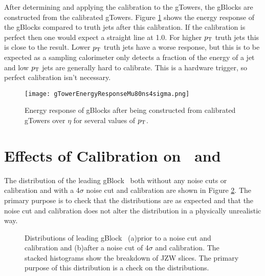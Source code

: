  After determining and applying the calibration to the gTowers, the gBlocks are constructed from the calibrated gTowers.  Figure \ref{fig:gTowerEnergyResponseSlice} shows the energy response of the gBlocks compared to truth jets after this calibration.  If the calibration is perfect then one would expect a straight line at 1.0.  For higher $p_{\mathrm{T}}$ truth jets this is close to the result.  Lower $p_{\mathrm{T}}$ truth jets have a worse response, but this is to be expected as a sampling calorimeter only detects a fraction of the energy of a jet and low $p_{\mathrm{T}}$ jets are generally hard to calibrate.  This is a hardware trigger, so perfect calibration isn't necessary. \\
 
  \begin{figure}[h!]
  \centering
	\texttt{[image: gTowerEnergyResponseMu80ns4sigma.png]}
\caption[Energy response of gBlocks]{\label{fig:gTowerEnergyResponseSlice}{Energy response of gBlocks after being constructed from calibrated gTowers over $\eta$ for several values of $p_{\mathrm{T}}$.}}
\end{figure}
 
  

\section{Effects of Calibration on \pt\ and \met\ }

The distribution of the leading gBlock \pt\ both without any noise cuts or calibration and with a 4$\sigma$ noise cut and calibration are shown in Figure \ref{fig:gBlockPt}.  The primary purpose is to check that the distributions are as expected and that the noise cut and calibration does not alter the distribution in a physically unrealistic way. \\

\begin{figure}[t]
  \begin{center}
    \caption[Distributions of gBlock \pt\ .]{Distributions of leading gBlock \pt\ (a)prior to a noise cut and calibration and (b)after a noise cut of 4$\sigma$ and calibration. The stacked histograms show the breakdown of JZW slices.  The primary purpose of this distribution is a check on the distributions.}
    \label{fig:gBlockPt}
  \end{center}
\end{figure}
 
